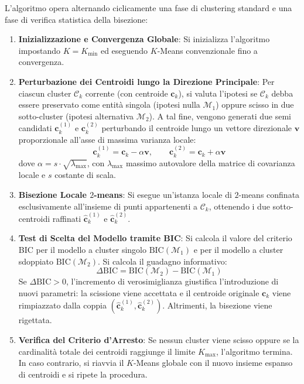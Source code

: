 L'algoritmo opera alternando ciclicamente una fase di clustering standard e una fase di verifica statistica della bisezione:
\begin{enumerate}
    \item \textbf{Inizializzazione e Convergenza Globale}: Si inizializza l'algoritmo impostando $K = K_{\min}$ ed eseguendo $K$-Means convenzionale fino a convergenza.
    \item \textbf{Perturbazione dei Centroidi lungo la Direzione Principale}: Per ciascun cluster $\mathcal{C}_k$ corrente (con centroide $\mathbf{c}_k$), si valuta l'ipotesi se $\mathcal{C}_k$ debba essere preservato come entità singola (ipotesi nulla $\mathcal{M}_1$) oppure scisso in due sotto-cluster (ipotesi alternativa $\mathcal{M}_2$). A tal fine, vengono generati due semi candidati $\mathbf{c}_k^{(1)}$ e $\mathbf{c}_k^{(2)}$ perturbando il centroide lungo un vettore direzionale $\mathbf{v}$ proporzionale all'asse di massima varianza locale:
    \begin{equation}
    \label{eq:dm-xmeans-perturbation}
    \mathbf{c}_k^{(1)} = \mathbf{c}_k - \alpha \mathbf{v}, \qquad \mathbf{c}_k^{(2)} = \mathbf{c}_k + \alpha \mathbf{v}
    \end{equation}
    dove $\alpha = s \cdot \sqrt{\lambda_{\max}}$, con $\lambda_{\max}$ massimo autovalore della matrice di covarianza locale e $s$ costante di scala.
    \item \textbf{Bisezione Locale $2$-means}: Si esegue un'istanza locale di $2$-means confinata esclusivamente all'insieme di punti appartenenti a $\mathcal{C}_k$, ottenendo i due sotto-centroidi raffinati $\hat{\mathbf{c}}_k^{(1)}$ e $\hat{\mathbf{c}}_k^{(2)}$.
    \item \textbf{Test di Scelta del Modello tramite BIC}: Si calcola il valore del criterio BIC per il modello a cluster singolo $\text{BIC}(\mathcal{M}_1)$ e per il modello a cluster sdoppiato $\text{BIC}(\mathcal{M}_2)$. Si calcola il guadagno informativo:
    \begin{equation}
    \label{eq:dm-delta-bic}
    \Delta\mathrm{BIC} = \mathrm{BIC}(\mathcal{M}_2) - \mathrm{BIC}(\mathcal{M}_1)
    \end{equation}
    Se $\Delta\mathrm{BIC} > 0$, l'incremento di verosimiglianza giustifica l'introduzione di nuovi parametri: la scissione viene accettata e il centroide originale $\mathbf{c}_k$ viene rimpiazzato dalla coppia $(\hat{\mathbf{c}}_k^{(1)}, \hat{\mathbf{c}}_k^{(2)})$. Altrimenti, la bisezione viene rigettata.
    \item \textbf{Verifica del Criterio d'Arresto}: Se nessun cluster viene scisso oppure se la cardinalità totale dei centroidi raggiunge il limite $K_{\max}$, l'algoritmo termina. In caso contrario, si riavvia il $K$-Means globale con il nuovo insieme espanso di centroidi e si ripete la procedura.
\end{enumerate}

